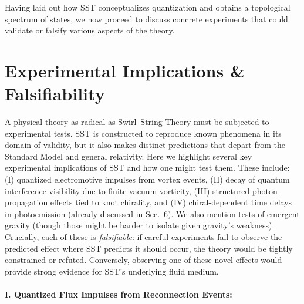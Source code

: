 \documentclass[10pt,reprint,aps,onecolumn,nofootinbib]{revtex4-2}
\begin{document}
Having laid out how SST conceptualizes quantization and obtains a topological spectrum of states, we now proceed to discuss concrete experiments that could validate or falsify various aspects of the theory.


\section{Experimental Implications \& Falsifiability}

A physical theory as radical as Swirl–String Theory must be subjected to experimental tests. SST is constructed to reproduce known phenomena in its domain of validity, but it also makes distinct predictions that depart from the Standard Model and general relativity. Here we highlight several key experimental implications of SST and how one might test them. These include: (I) quantized electromotive impulses from vortex events, (II) decay of quantum interference visibility due to finite vacuum vorticity, (III) structured photon propagation effects tied to knot chirality, and (IV) chiral-dependent time delays in photoemission (already discussed in Sec.~6). We also mention tests of emergent gravity (though those might be harder to isolate given gravity’s weakness). Crucially, each of these is \emph{falsifiable}: if careful experiments fail to observe the predicted effect where SST predicts it should occur, the theory would be tightly constrained or refuted. Conversely, observing one of these novel effects would provide strong evidence for SST’s underlying fluid medium.


\paragraph{I. Quantized Flux Impulses from Reconnection Events:}
\end{document}
